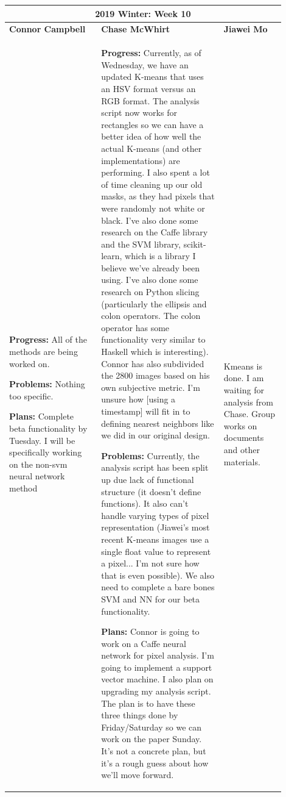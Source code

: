 \documentclass[10pt,journal,compsoc, draftclsnofoot,onecolumn]{IEEEtran}
\begin{document}
\begin{center}
\begin{tabular}{|p{0.3\linewidth}|p{0.4\linewidth}|p{0.2\linewidth}|}
\hline
\multicolumn{3}{|c|}{\textbf{2019 Winter: Week 10}} \\
\hline
\textbf{Connor Campbell} & \textbf{Chase McWhirt} & \textbf{Jiawei Mo} \\ [0.5ex]
\hline\hline

\textbf{Progress:} All of the methods are being worked on.

\textbf{Problems:} Nothing too specific.

\textbf{Plans:} Complete beta functionality by Tuesday. I will be specifically working on the non-svm neural network method
&
\textbf{Progress:} Currently, as of Wednesday, we have an updated K-means that uses an HSV format versus an RGB format.
The analysis script now works for rectangles so we can have a better idea of how well the actual K-means (and other implementations) are performing.
I also spent a lot of time cleaning up our old masks, as they had pixels that were randomly not white or black.
I've also done some research on the Caffe library and the SVM library, scikit-learn, which is a library I believe we've already been using.
I've also done some research on Python slicing (particularly the ellipsis and colon operators. The colon operator has some functionality very similar to Haskell which is interesting).
Connor has also subdivided the 2800 images based on his own subjective metric.
I'm unsure how [using a timestamp] will fit in to defining nearest neighbors like we did in our original design.

\textbf{Problems:} Currently, the analysis script has been split up due lack of functional structure (it doesn't define functions).
It also can't handle varying types of pixel representation (Jiawei's most recent K-means images use a single float value to represent a pixel... I'm not sure how that is even possible).
We also need to complete a bare bones SVM and NN for our beta functionality.

\textbf{Plans:} Connor is going to work on a Caffe neural network for pixel analysis.
I'm going to implement a support vector machine.
I also plan on upgrading my analysis script.
The plan is to have these three things done by Friday/Saturday so we can work on the paper Sunday.
It's not a concrete plan, but it's a rough guess about how we'll move forward.
&
Kmeans is done. I am waiting for analysis from Chase. Group works on documents and other materials.
\\ \hline
\end{tabular}
\end{center}
\end{document}
